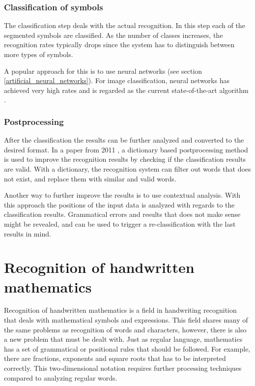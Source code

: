 \subsubsection{Classification of symbols}
The classification step deals with the actual recognition. In this step each of the segmented symbols are classified. As the number of classes increases, the recognition rates typically drops since the system has to distinguish between more types of symbols.

A popular approach for this is to use neural networks (see section \ref{artificial_neural_networks}). For image classification, neural networks has achieved very high rates and is regarded as the current state-of-the-art algorithm \cite{seif_deep_2018}.

\subsubsection{Postprocessing}

After the classification the results can be further analyzed and converted to the desired format. In a paper from 2011 \cite{hu_research_2011}, a dictionary based postprocessing method is used to improve the recognition results by checking if the classification results are valid. With a dictionary, the recognition system can filter out words that does not exist, and replace them with similar and valid words. 

Another way to further improve the results is to use contextual analysis. With this approach the positions of the input data is analyzed with regards to the classification results. Grammatical errors and results that does not make sense might be revealed, and can be used to trigger a re-classification with the last results in mind.


\section{Recognition of handwritten mathematics} 
\label{recognition_of_handwritten_mathematics}
Recognition of handwritten mathematics is a field in handwriting recognition that deals with mathematical symbols and expressions. This field shares many of the same problems as recognition of words and characters, however, there is also a new problem that must be dealt with. Just as regular language, mathematics has a set of grammatical or positional rules that should be followed. For example, there are fractions, exponents and square roots that has to be interpreted correctly. This two-dimensional notation requires further processing techniques compared to analyzing regular words.

